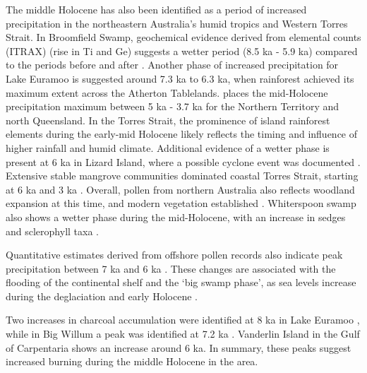 \documentclass[
  12pt,
]{book}
\begin{document}
The middle Holocene has also been identified as a period of increased precipitation in the northeastern Australia's humid tropics and Western Torres Strait. In Broomfield Swamp, geochemical evidence derived from elemental counts (ITRAX) (rise in Ti and Ge) suggests a wetter period (8.5 ka - 5.9 ka) compared to the periods before and after \citep{burrowsNewLateQuaternary2016a}. Another phase of increased precipitation for Lake Euramoo is suggested around 7.3 ka to 6.3 ka, when rainforest achieved its maximum extent across the Atherton Tablelands. \citet{shulmeisterAustralasianEvidenceMidholocene1999} places the mid-Holocene precipitation maximum between 5 ka - 3.7 ka for the Northern Territory and north Queensland. In the Torres Strait, the prominence of island rainforest elements during the early-mid Holocene likely reflects the timing and influence of higher rainfall and humid climate. Additional evidence of a wetter phase is present at 6 ka in Lizard Island, where a possible cyclone event was documented \citep{proskeIslandEcosystemBiodiversity2012}. Extensive stable mangrove communities dominated coastal Torres Strait, starting at 6 ka and 3 ka \citep{rowePalynologicalInvestigationHolocene2007}. Overall, pollen from northern Australia also reflects woodland expansion at this time, and modern vegetation established \citep{proskeHoloceneRecordCoastal2014}. Whiterspoon swamp also shows a wetter phase during the mid-Holocene, with an increase in sedges and sclerophyll taxa \citep{mossHoloceneEnvironmentsSclerophyll2012a}.

Quantitative estimates derived from offshore pollen records also indicate peak precipitation between 7 ka and 6 ka \citep{vanderkaars100000yearRecord2006}. These changes are associated with the flooding of the continental shelf and the `big swamp phase', as sea levels increase during the deglaciation and early Holocene \citep{woodroffeDevelopmentWidespreadMangrove1985}.

Two increases in charcoal accumulation were identified at 8 ka in Lake Euramoo \citep{haberle23000yrPollen2005}, while in Big Willum a peak was identified at 7.2 ka \citep{stevensonPalaeoenvironmentalHistoryBig2015}. Vanderlin Island in the Gulf of Carpentaria shows an increase around 6 ka. In summary, these peaks suggest increased burning during the middle Holocene in the area.
\end{document}
